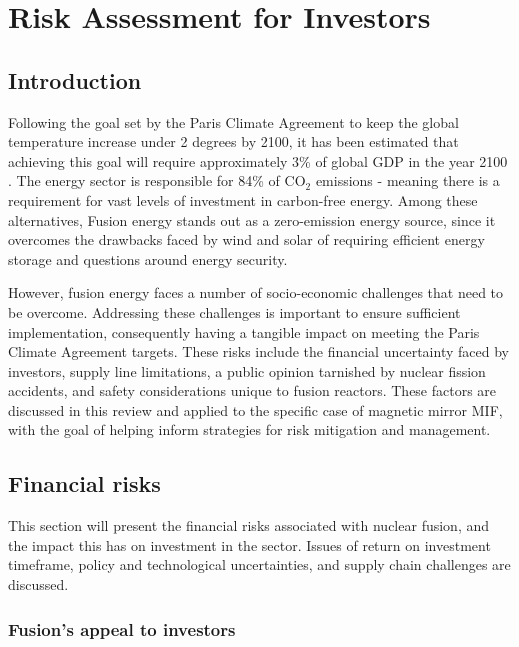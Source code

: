 \section{Risk Assessment for Investors}


\subsection{Introduction}

Following the goal set by the Paris Climate Agreement to keep the global temperature increase under 2 degrees by 2100,  it has been estimated that achieving this goal will require approximately 3\% of global GDP in the year 2100 \cite{schleussner2016science, tol2022costs}. The energy sector is responsible for 84\% of CO$_2$ emissions - meaning there is a requirement for vast levels of investment in carbon-free energy. Among these alternatives, Fusion energy stands out as a  zero-emission energy source, since it overcomes the drawbacks faced by wind and solar of requiring efficient energy storage and questions around energy security. 

However, fusion energy faces a number of socio-economic challenges that need to be overcome. Addressing these challenges is important to ensure sufficient implementation, consequently having a tangible impact on meeting the Paris Climate Agreement targets. These risks include the financial uncertainty faced by investors, supply line limitations, a public opinion tarnished by nuclear fission accidents, and safety considerations unique to fusion reactors. These factors are discussed in this review and applied to the specific case of magnetic mirror MIF, with the goal of helping inform strategies for risk mitigation and management.


\subsection{Financial risks}

This section will present the financial risks associated with nuclear fusion, and the impact this has on investment in the sector. Issues of return on investment timeframe, policy and technological uncertainties, and supply chain challenges are discussed. 

\subsubsection{Fusion’s appeal to investors}


